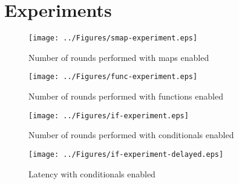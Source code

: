 \chapter{Experiments}

\label{ChapterExperiments}

\begin{figure}
    \texttt{[image: ../Figures/smap-experiment.eps]}
    \caption{Number of rounds performed with maps enabled}
\end{figure}

\begin{figure}
    \texttt{[image: ../Figures/func-experiment.eps]}
    \caption{Number of rounds performed with functions enabled}
\end{figure}

\begin{figure}
    \texttt{[image: ../Figures/if-experiment.eps]}
    \caption{Number of rounds performed with conditionals enabled}
\end{figure}

\begin{figure}
    \texttt{[image: ../Figures/if-experiment-delayed.eps]}
    \caption{Latency with conditionals enabled}
\end{figure}

